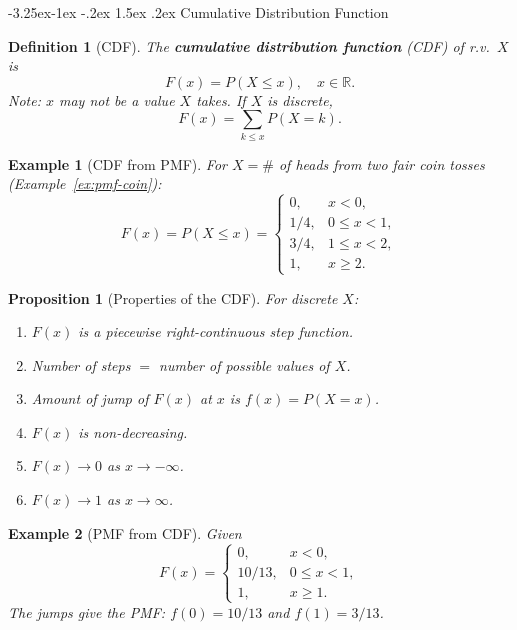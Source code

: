 \documentclass{article}
\makeatletter
\newtheorem{definition}[theorem]{Definition}
\newtheorem{proposition}[theorem]{Proposition}
\newtheorem{example}{Example}[section]
\theoremstyle{remark}
\newlength{\subsecindent}
\renewcommand\subsection{\@startsection{subsection}{2}{\subsecindent}%
  {-3.25ex\@plus -1ex \@minus -.2ex}%
  {1.5ex \@plus .2ex}%
  {\normalfont\large\bfseries}}
\newenvironment{sub}{%
  \begin{list}{}{%
    \setlength{\leftmargin}{4em}%
    \setlength{\rightmargin}{0pt}%
    \setlength{\topsep}{0pt}%
    \setlength{\partopsep}{0pt}%
    \setlength{\parsep}{\parskip}%
    \setlength{\itemsep}{\parskip}%
  }\item\relax
}{\end{list}}
\newcommand{\R}{\mathbb{R}}
\makeatother
\begin{document}
\subsection{Cumulative Distribution Function}
\begin{sub}

\begin{definition}[CDF]
  \label{def:cdf}
  The \textbf{cumulative distribution function} (CDF) of r.v.\ $X$ is
  \begin{equation}
    F(x) = P(X \le x), \quad x \in \R.
    \label{eq:cdf}
  \end{equation}
  Note: $x$ may not be a value $X$ takes.
  If $X$ is discrete,
  \begin{equation}
    F(x) = \sum_{k \le x} P(X = k).
    \label{eq:cdf-disc}
  \end{equation}
\end{definition}

\begin{example}[CDF from PMF]
  \label{ex:cdf-coin}
  For $X = \#$ of heads from two fair coin tosses (Example~\ref{ex:pmf-coin}):
  \[
    F(x) = P(X \le x) =
    \begin{cases}
      0,    & x < 0, \\
      1/4,  & 0 \le x < 1, \\
      3/4,  & 1 \le x < 2, \\
      1,    & x \ge 2.
    \end{cases}
  \]
\end{example}

\begin{proposition}[Properties of the CDF]
  \label{prop:cdf-prop}
  For discrete $X$:
  \begin{enumerate}
    \item $F(x)$ is a piecewise right-continuous step function.
    \item Number of steps $=$ number of possible values of $X$.
    \item Amount of jump of $F(x)$ at $x$ is $f(x) = P(X = x)$.
    \item $F(x)$ is non-decreasing.
    \item $F(x) \to 0$ as $x \to -\infty$.
    \item $F(x) \to 1$ as $x \to \infty$.
  \end{enumerate}
\end{proposition}

\begin{example}[PMF from CDF]
  \label{ex:pmf-from-cdf}
  Given
  \[
    F(x) = \begin{cases}
      0,      & x < 0, \\
      10/13,  & 0 \le x < 1, \\
      1,      & x \ge 1.
    \end{cases}
  \]
  The jumps give the PMF: $f(0) = 10/13$ and $f(1) = 3/13$.


\end{example}
\end{sub}
\end{document}
